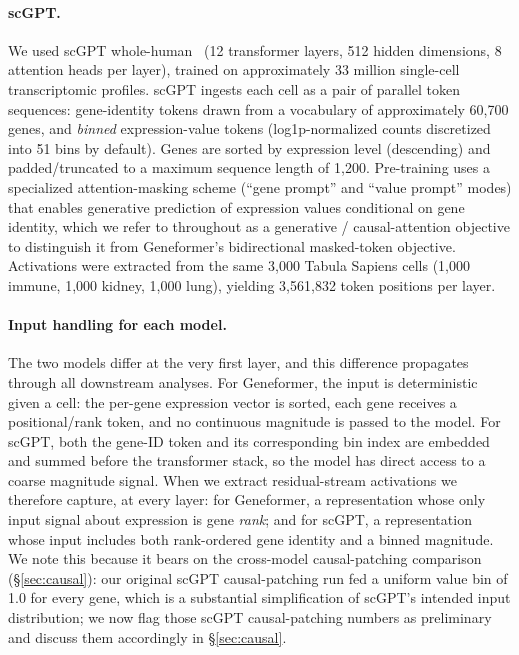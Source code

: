 \documentclass[onecolumn]{article}
\begin{document}
\paragraph{scGPT.} We used scGPT whole-human~\cite{cui2024scgpt} (12 transformer layers, 512 hidden dimensions, 8 attention heads per layer), trained on approximately 33 million single-cell transcriptomic profiles. scGPT ingests each cell as a pair of parallel token sequences: gene-identity tokens drawn from a vocabulary of approximately 60,700 genes, and \emph{binned} expression-value tokens (log1p-normalized counts discretized into 51 bins by default). Genes are sorted by expression level (descending) and padded/truncated to a maximum sequence length of 1,200. Pre-training uses a specialized attention-masking scheme (``gene prompt'' and ``value prompt'' modes) that enables generative prediction of expression values conditional on gene identity, which we refer to throughout as a generative / causal-attention objective to distinguish it from Geneformer's bidirectional masked-token objective. Activations were extracted from the same 3,000 Tabula Sapiens cells (1,000 immune, 1,000 kidney, 1,000 lung), yielding 3,561,832 token positions per layer.

\paragraph{Input handling for each model.} The two models differ at the very first layer, and this difference propagates through all downstream analyses. For Geneformer, the input is deterministic given a cell: the per-gene expression vector is sorted, each gene receives a positional/rank token, and no continuous magnitude is passed to the model. For scGPT, both the gene-ID token and its corresponding bin index are embedded and summed before the transformer stack, so the model has direct access to a coarse magnitude signal. When we extract residual-stream activations we therefore capture, at every layer: for Geneformer, a representation whose only input signal about expression is gene \emph{rank}; and for scGPT, a representation whose input includes both rank-ordered gene identity and a binned magnitude. We note this because it bears on the cross-model causal-patching comparison (\S\ref{sec:causal}): our original scGPT causal-patching run fed a uniform value bin of 1.0 for every gene, which is a substantial simplification of scGPT's intended input distribution; we now flag those scGPT causal-patching numbers as preliminary and discuss them accordingly in \S\ref{sec:causal}.
\end{document}

